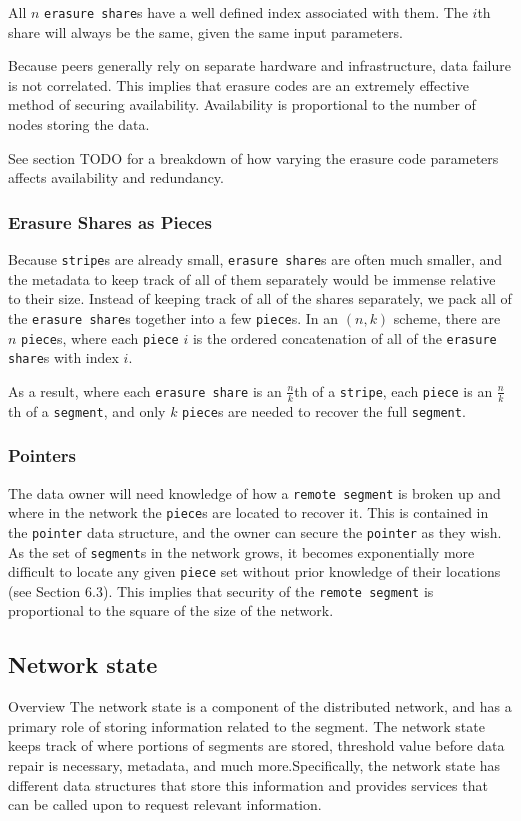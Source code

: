 \documentclass[a4paper,10pt]{article}
\newcommand{\x}[1]{{\tt #1}}
\newcommand{\todo}[1]{{\color{red} TODO #1}}
\begin{document}
All $n$ \x{erasure share}s have a well defined index associated with them. The
$i$th share will always be the same, given the same input parameters.

Because peers generally rely on separate hardware and infrastructure, data
failure is not correlated. This implies that erasure codes are an extremely
effective method of securing availability. Availability is proportional to the
number of nodes storing the data.

See section \todo{} for a breakdown of how varying the erasure code parameters
affects availability and redundancy.

\subsubsection{Erasure Shares as Pieces}

Because \x{stripe}s are already small, \x{erasure share}s are often
much smaller, and the metadata to keep track of all of them separately would be
immense relative to their size. Instead of keeping track of all of the shares
separately, we pack all of the \x{erasure share}s together into a few
\x{piece}s. In an $(n, k)$ scheme, there are $n$ \x{piece}s, where each
\x{piece} $i$ is the ordered concatenation of all of the \x{erasure share}s
with index $i$.

As a result, where each \x{erasure share} is an $\frac{n}{k}$th of a \x{stripe},
each \x{piece} is an $\frac{n}{k}$th of a \x{segment}, and only $k$ \x{piece}s
are needed to recover the full \x{segment}.

\subsubsection{Pointers}

The data owner will need knowledge of how a \x{remote segment} is broken up and
where in the network the \x{piece}s are located to recover it. This is contained
in the \x{pointer} data structure, and the owner can secure the \x{pointer} as
they wish. As the set of \x{segment}s in the network grows, it becomes
exponentially more difficult to locate any given \x{piece} set without prior
knowledge of their locations (see Section 6.3). This implies that security of
the \x{remote segment} is proportional to the square of the size of the network.

\subsection{Network state}
Overview
The network state is a component of the distributed network, and has a primary role of storing information related to the segment. The network state keeps track of where portions of segments are stored, threshold value before data repair is necessary, metadata, and much more.Specifically, the network state has different data structures that store this information and provides services that can be called upon to request relevant information. 
\end{document}
